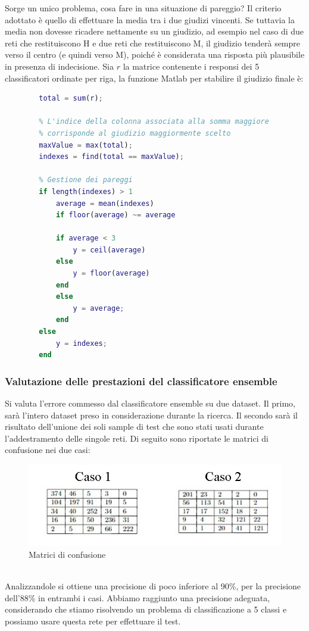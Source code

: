 \documentclass[a4paper,11pt]{article}
\begin{document}
    \newpage
    Sorge un unico problema, cosa fare in una situazione di pareggio? Il criterio adottato è quello di effettuare la media tra i due giudizi vincenti.
    Se tuttavia la media non dovesse ricadere nettamente su un giudizio, ad esempio nel caso di due reti che restituiscono H e due reti che restituiscono M, il giudizio tenderà sempre
    verso il centro (e quindi verso M), poiché è considerata una risposta più plausibile in presenza di indecisione.
    Sia $r$ la matrice contenente i responsi dei 5 classificatori ordinate per riga, la funzione Matlab per stabilire il giudizio finale è:
    \begin{lstlisting}[language=Matlab]
        % Si calcola la somma per colonna 
        total = sum(r);

        % L'indice della colonna associata alla somma maggiore
        % corrisponde al giudizio maggiormente scelto
        maxValue = max(total);
        indexes = find(total == maxValue);

        % Gestione dei pareggi
        if length(indexes) > 1 
            average = mean(indexes)
            if floor(average) ~= average

            if average < 3
                y = ceil(average)
            else
                y = floor(average)
            end
            else 
                y = average;
            end
        else 
            y = indexes;
        end
    \end{lstlisting}
    \newpage
    \subsubsection{Valutazione delle prestazioni del classificatore ensemble}
    Si valuta l'errore commesso dal classificatore ensemble su due dataset. Il primo, sarà l'intero dataset preso in considerazione durante la ricerca.
    Il secondo sarà il risultato dell'unione dei soli sample di test che sono stati usati durante l'addestramento delle singole reti. 
    Di seguito sono riportate le matrici di confusione nei due casi:
    \begin{figure}[h]
        \centering
        \includegraphics{confusion3}
        \caption{Matrici di confusione}
    \end{figure}
    \\Analizzandole si ottiene una precisione di poco inferiore al 90\%, per la precisione dell'88\% in entrambi i casi. 
    Abbiamo raggiunto una precisione adeguata, considerando che stiamo risolvendo un problema di classificazione a 5 classi e possiamo usare questa rete per effettuare il test.
    \newpage
\end{document}
